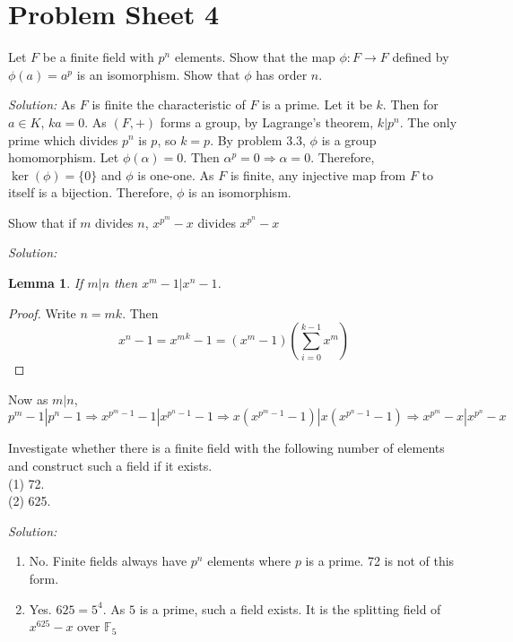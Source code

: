 \documentclass[a4paper, 11pt]{article}
\newenvironment{solution}
    {\textit{Solution:}}
    {}
\newtheorem{lemma}[theorem]{Lemma}
\begin{document}
\section{Problem Sheet 4}

\begin{tcolorbox}[colback=c2,colframe=c1,title=Problem 4.1] 
    Let $F$ be a finite field with $p^n$
    elements. Show that the map $\phi : F \to F$ defined
    by $\phi(a) = a^p$    is an isomorphism. Show that $\phi$ has order $n$.    
\end{tcolorbox}
\begin{solution}
    As $F$ is finite the characteristic of $F$ is a prime. Let it be $k$. Then for $a\in K$, $ka=0$. As $(F,+)$ forms a group, by Lagrange's theorem, $k|p^n$. The only prime which divides $p^n$ is $p$, so $k=p$. By problem 3.3, $\phi$ is a group homomorphism. Let $\phi(\alpha)=0$. Then $\alpha^p=0\Rightarrow \alpha=0$. Therefore, $\ker(\phi)=\{0\}$ and $\phi$ is one-one. As $F$ is finite, any injective map from $F$ to itself is a bijection. Therefore, $\phi$ is an isomorphism.
\end{solution}



\begin{tcolorbox}[colback=c2,colframe=c1,title=Problem 4.2]
    Show that if $m$ divides $n$, $x^{p^m}-x$ divides $x^{p^n}-x$
\end{tcolorbox}
\begin{solution}
    \begin{lemma}
        If $m|n$ then $x^m-1|x^n-1$.
    \end{lemma}
    \begin{proof}
        Write $n=mk$. Then $$x^n-1={x^m}^k-1=(x^m-1)\left(\sum_{i=0}^{k-1}x^m\right)$$
    \end{proof}
    Now as $m|n$, $$p^m-1|p^n-1\Rightarrow x^{p^m-1}-1|x^{p^n-1}-1\Rightarrow x(x^{p^m-1}-1)|x(x^{p^n-1}-1)\Rightarrow x^{p^m}-x|x^{p^n}-x$$
\end{solution}

\begin{tcolorbox}[colback=c2,colframe=c1,title=Problem 4.3]
    Investigate whether there is a finite field with the following number of
elements and construct such a field if it exists.\\
(1) 72.\\
(2) 625.\\
\end{tcolorbox}
\begin{solution}
    \begin{enumerate}
        \item No. Finite fields always have $p^n$ elements where $p$ is a prime. 72 is not of this form.
        \item Yes. $625=5^4$. As $5$ is a prime, such a field exists. It is the splitting field of $x^{625}-x$ over $\mathbb F_5$
    \end{enumerate}
\end{solution}
\end{document}
